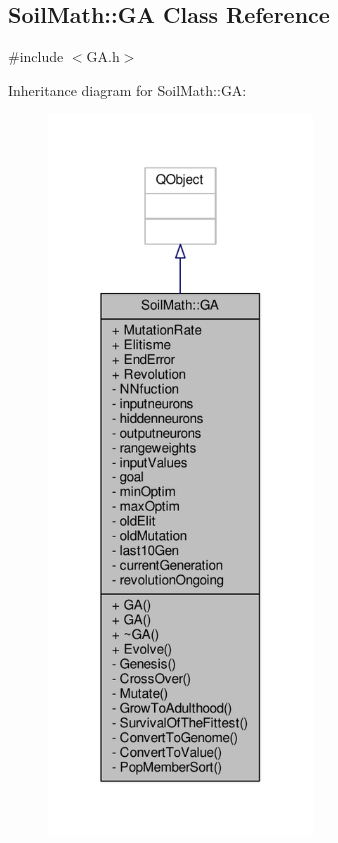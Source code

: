 \hypertarget{class_soil_math_1_1_g_a}{}\subsection{Soil\+Math\+:\+:G\+A Class Reference}
\label{class_soil_math_1_1_g_a}


{\ttfamily \#include $<$G\+A.\+h$>$}



Inheritance diagram for Soil\+Math\+:\+:G\+A\+:
\nopagebreak
\begin{figure}[H]
\begin{center}
\leavevmode
\includegraphics[width=199pt]{class_soil_math_1_1_g_a__inherit__graph}
\end{center}
\end{figure}


